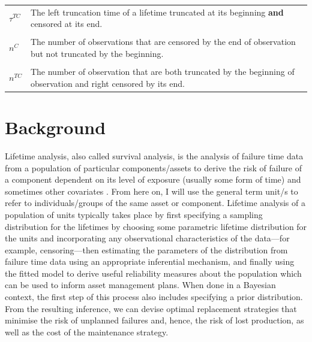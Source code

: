 \begin{table}
\begin{tabularx}{\textwidth}{lY}
    $\tau^{TC}$ & The left truncation time of a lifetime truncated at its beginning \textbf{and} censored at its end.\\
     & \\
    $n^C$ & The number of observations that are censored by the end of observation but not truncated by the beginning.\\
     & \\
    $n^{TC}$ & The number of observation that are both truncated by the beginning of observation and right censored by its end.\\

    \bottomrule
    \end{tabularx}
\end{table}
    

\section{Background} \label{sec:lifetime-data-background}

Lifetime analysis, also called survival analysis, is the analysis of failure time data from a population of particular components/assets to derive the risk of failure of a component dependent on its level of exposure (usually some form of time) and sometimes other covariates \citep{moore2016}. From here on, I will use the general term unit/s to refer to individuals/groups of the same asset or component. Lifetime analysis of a population of units typically takes place by first specifying a sampling distribution for the lifetimes by choosing some parametric lifetime distribution for the units and incorporating any observational characteristics of the data---for example, censoring---then estimating the parameters of the distribution from failure time data using an appropriate inferential mechanism, and finally using the fitted model to derive useful reliability measures about the population which can be used to inform asset management plans. When done in a Bayesian context, the first step of this process also includes specifying a prior distribution. From the resulting inference, we can devise optimal replacement strategies that minimise the risk of unplanned failures and, hence, the risk of lost production, as well as the cost of the maintenance strategy.

